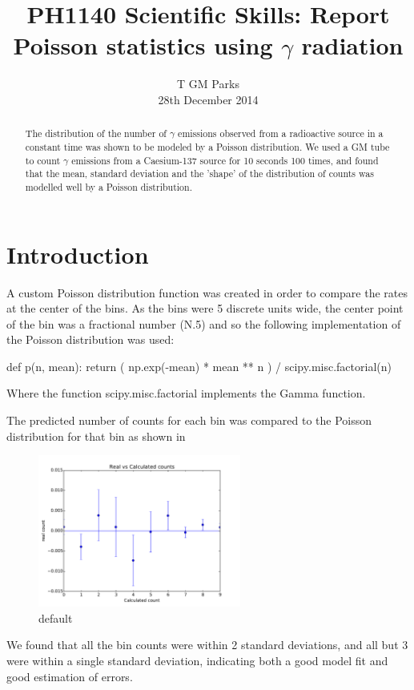 \documentclass[10pt]{iopart}
\begin{document}
\title[PH1140 Report - T GM Parks]{PH1140 Scientific Skills: Report Poisson statistics using $\gamma$ radiation}

\author{T GM Parks\\28th December 2014}

\begin{abstract}
The distribution of the number of $\gamma$ emissions observed from a radioactive source in a constant time was shown to be modeled by a Poisson distribution. We used a GM tube to count $\gamma$ emissions from a Caesium-137 source for 10 seconds 100 times, and found that the mean, standard deviation and the 'shape' of the distribution of counts was modelled well by a Poisson distribution.
\end{abstract}


\section{Introduction}

A custom Poisson distribution function was created in order to compare the rates at the center of the bins. As the bins were 5 discrete units wide, the center point of the bin was a fractional number (N.5) and so the following implementation of the Poisson distribution was used:

def p(n, mean):
	return ( np.exp(-mean) * mean ** n ) / scipy.misc.factorial(n)

Where the function scipy.misc.factorial implements the Gamma function.

The predicted number of counts for each bin was compared to the Poisson distribution for that bin as shown in \begin{figure}[htbp]
\begin{center}
\includegraphics[height=5cm]{errorcomp.pdf}
\caption{default}
\label{default}
\end{center}
\end{figure}
 We found that all the bin counts were within 2 standard deviations, and all but 3 were within a single standard deviation, indicating both a good model fit and good estimation of errors.
\end{document}
